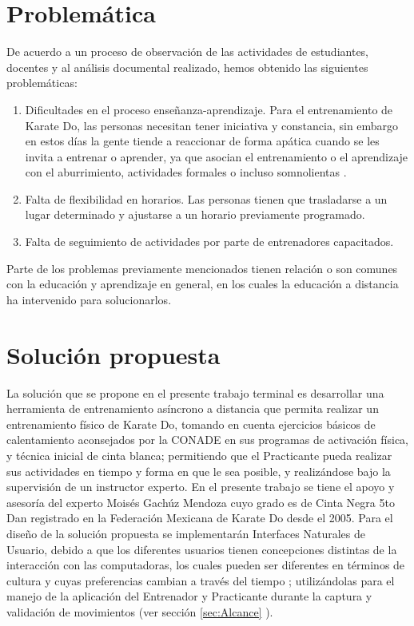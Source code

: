 \section{Problemática}
De acuerdo a un proceso de observación de las actividades de estudiantes, docentes y  al análisis documental realizado, hemos obtenido las siguientes problemáticas:

\begin{enumerate}
	\item Dificultades en el proceso enseñanza-aprendizaje. Para el entrenamiento de Karate Do, las personas necesitan tener iniciativa y constancia, sin embargo en estos días la gente tiende a reaccionar de forma apática cuando se les invita a entrenar o aprender, ya que asocian el entrenamiento o el aprendizaje con el aburrimiento,  actividades formales o incluso somnolientas \cite{Chye}.
	\item Falta de flexibilidad en horarios. Las personas tienen que trasladarse a un lugar determinado y ajustarse a un horario previamente programado.
	\item Falta de seguimiento de actividades por parte de entrenadores capacitados.
\end{enumerate}

Parte de los problemas previamente mencionados tienen relación o son comunes con la educación y aprendizaje en general, en los cuales la educación a distancia ha intervenido para solucionarlos.

\section{Solución propuesta}
La solución que se propone en el  presente trabajo terminal es desarrollar una herramienta de entrenamiento asíncrono a distancia que permita realizar un entrenamiento físico de Karate Do, tomando en cuenta ejercicios básicos de calentamiento aconsejados por la CONADE en sus programas de activación física, y técnica inicial de cinta blanca; permitiendo que el Practicante pueda realizar sus actividades en tiempo y forma en que le sea posible, y realizándose bajo la supervisión de un instructor experto. En el presente trabajo se tiene el apoyo y asesoría del experto Moisés Gachúz Mendoza cuyo grado es de Cinta Negra 5to Dan registrado en la Federación Mexicana de Karate Do desde el 2005.
Para el diseño de la solución propuesta se implementarán Interfaces Naturales de Usuario, debido a que los diferentes usuarios tienen concepciones distintas de la interacción con las computadoras, los cuales pueden ser diferentes en términos de cultura y cuyas preferencias cambian a través del tiempo \cite{Gomez}; utilizándolas para el manejo de la aplicación del Entrenador y Practicante durante la captura y validación de movimientos (ver sección \ref{sec:Alcance} ).\\

